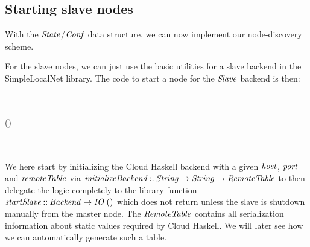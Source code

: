 \documentclass[paper=A4,twoside=true,openright,parskip=full,chapterprefix=true,headings=normal,bibliography=totoc,listof=totoc,titlepage=on,captions=tableabove,draft=false,british]{scrreprt}%
\begin{document}
\hypertarget{starting-slave-nodes}{%
\subsection{Starting slave nodes}\label{starting-slave-nodes}}

\label{sec:cloudhaskellslaves}

With the \ensuremath{\Conid{State}}/\ensuremath{\Conid{Conf}} data structure, we can now implement our
node-discovery scheme.

For the slave nodes, we can just use the basic utilities for a slave
backend in the SimpleLocalNet library. The code to start a node for the
\ensuremath{\Conid{Slave}} backend is then:


\begin{hscode}\SaveRestoreHook
{}%
%
%
\>[B]{}\;\mathrel{=}\<[E]%
\\
\>[B]{}\;\mathrel{=}\<[E]%
\\[\blanklineskip]%
\>[B]{}\mathbin{::}\to {}\to {}\to {}\;(){}\<[E]%
\\
\>[B]{}\;\;\;\mathrel{=}\<[E]%
\\
\>[B]{}\<[3]%
\>[3]{}\leftarrow {}\;\;\;\<[E]%
\\
\>[B]{}\<[3]%
\>[3]{}\;\<[E]%
\ColumnHook
\end{hscode}\resethooks
\vspace{-2\baselineskip}

We here start by initializing the Cloud Haskell backend with a given
\ensuremath{\Varid{host}}, \ensuremath{\Varid{port}} and \ensuremath{\Varid{remoteTable}} via
\ensuremath{\Varid{initializeBackend}\mathbin{::}\Conid{String}\to \Conid{String}\to \Conid{RemoteTable}} to then delegate
the logic completely to the library function
\ensuremath{\Varid{startSlave}\mathbin{::}\Conid{Backend}\to \Conid{IO}\;()} which does not return unless the slave
is shutdown manually from the master node. The \ensuremath{\Conid{RemoteTable}} contains
all serialization information about static values required by Cloud
Haskell. We will later see how we can automatically generate such a
table.
\end{document}
